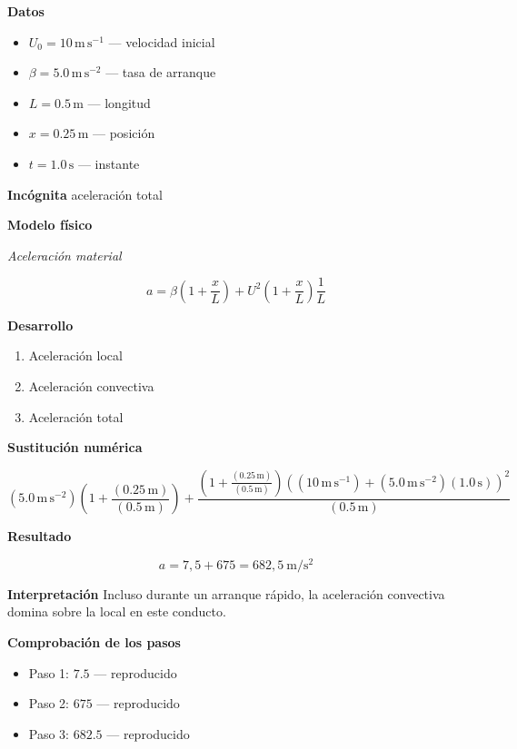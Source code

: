 \documentclass[10pt,openany]{book}
\begin{document}
\noindent\textbf{Datos}
\begin{itemize}
\item $U_{0} = 10\,\mathrm{m}\,\mathrm{s}^{-1}$ — velocidad inicial
\item $\beta = 5.0\,\mathrm{m}\,\mathrm{s}^{-2}$ — tasa de arranque
\item $L = 0.5\,\mathrm{m}$ — longitud
\item $x = 0.25\,\mathrm{m}$ — posición
\item $t = 1.0\,\mathrm{s}$ — instante
\end{itemize}

\noindent\textbf{Incógnita}
aceleración total

\noindent\textbf{Modelo físico}

\noindent\textit{Aceleración material}

\[
a = \beta\left(1 + \frac{x}{L}\right) + U^{2}\left(1 + \frac{x}{L}\right)\frac{1}{L}
\]

\noindent\textbf{Desarrollo}
\begin{enumerate}
\item
Aceleración local
\item
Aceleración convectiva
\item
Aceleración total
\end{enumerate}

\noindent\textbf{Sustitución numérica}

\[
\left(5.0\,\mathrm{m}\,\mathrm{s}^{-2}\right) \left(1 + \frac{\left(0.25\,\mathrm{m}\right)}{\left(0.5\,\mathrm{m}\right)}\right) + \frac{\left(1 + \frac{\left(0.25\,\mathrm{m}\right)}{\left(0.5\,\mathrm{m}\right)}\right) \left(\left(10\,\mathrm{m}\,\mathrm{s}^{-1}\right) + \left(5.0\,\mathrm{m}\,\mathrm{s}^{-2}\right) \left(1.0\,\mathrm{s}\right)\right)^{2}}{\left(0.5\,\mathrm{m}\right)}
\]

\noindent\textbf{Resultado}

\[
a = 7{,}5 + 675 = 682{,}5\ \mathrm{m/s^{2}}
\]

\noindent\textbf{Interpretación}
Incluso durante un arranque rápido, la aceleración convectiva domina sobre la local en este conducto.

\noindent\textbf{Comprobación de los pasos}
\begin{itemize}
\item Paso 1: $7.5$ — reproducido
\item Paso 2: $675$ — reproducido
\item Paso 3: $682.5$ — reproducido
\end{itemize}
\end{document}
